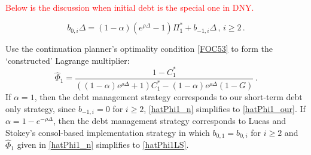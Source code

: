\documentclass[12pt]{article}
\newcommand{\WJ}[1]{{\textcolor{red}{#1}}}
\begin{document}
%
%





\WJ{Below is the discussion when initial debt is the special one in DNY.}


  \begin{equation} \label{b02_n1}
	b_{0, i}\Delta = (1-\alpha)(e^{\rho\Delta}-1)\Pi_1^*+b_{-1, i}\Delta\,,\,  i\geq 2\,.
\end{equation} 


Use  the continuation planner's optimality condition \eqref{FOC53} to form the  `constructed' Lagrange multiplier: 
\begin{equation} \label{hatPhi1_n1}
	\widehat{\Phi}_1 = \frac{1-C_1^*}{((1-\alpha)e^{\rho\Delta}+1)C_1^*-(1-\alpha)e^{\rho\Delta}(1-G)} \,.
\end{equation}
If $\alpha = 1$, then the debt management   strategy corresponds to our  short-term debt only strategy, %
 since $b_{-1,i} = 0$ for $i \geq 2$,  \eqref{hatPhi1_n} simplifies  to \eqref{hatPhi1_our}. 
If  $\alpha = 1 - e^{-\rho \Delta}$, then the debt management   strategy corresponds to  Lucas and Stokey's consol-based implementation strategy in which $b_{0,1} = b_{0,i}$ for $i \geq 2$ and $\widehat{\Phi}_1$ given in \eqref{hatPhi1_n} simplifies to  \eqref{hatPhi1LS}. 
\end{document}
